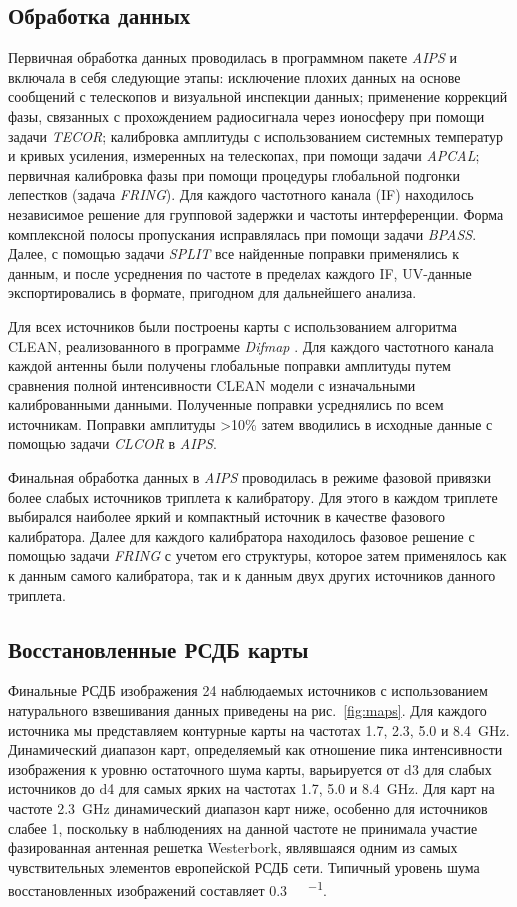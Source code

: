 \subsection{Обработка данных}
Первичная обработка данных проводилась в программном пакете \emph{AIPS} \cite{Greisen_2003} и
включала в себя следующие этапы: исключение плохих данных на основе сообщений с телескопов и
визуальной инспекции данных; применение коррекций фазы, связанных с прохождением радиосигнала через
ионосферу при помощи задачи \emph{TECOR}; калибровка амплитуды с использованием системных
температур и кривых усиления, измеренных на телескопах, при помощи задачи \emph{APCAL}; первичная
калибровка фазы при помощи процедуры глобальной подгонки лепестков (задача \emph{FRING}). Для
каждого частотного канала (IF) находилось независимое решение для групповой задержки и частоты
интерференции. Форма комплексной полосы пропускания исправлялась при помощи задачи
\emph{BPASS}. Далее, с помощью задачи \emph{SPLIT} все найденные поправки применялись к данным, и
после усреднения по частоте в пределах каждого IF, UV-данные экспортировались в формате, пригодном
для дальнейшего анализа.

Для всех источников были построены карты с использованием алгоритма CLEAN, реализованного в
программе {\em Difmap} \cite{Shepherd_1997}. Для каждого частотного канала каждой антенны
были получены глобальные поправки амплитуды путем сравнения полной интенсивности CLEAN модели с
изначальными калиброванными данными. Полученные поправки усреднялись по всем источникам.
Поправки амплитуды >10\% затем вводились в исходные данные с помощью задачи \emph{CLCOR} в
\emph{AIPS}.

Финальная обработка данных в \emph{AIPS} проводилась в режиме фазовой привязки более слабых
источников триплета к калибратору. Для этого в каждом триплете выбирался наиболее яркий и
компактный источник в качестве фазового калибратора. Далее для каждого калибратора находилось
фазовое решение с помощью задачи \emph{FRING} с учетом его структуры, которое затем применялось как
к данным самого калибратора, так и к данным двух других источников данного триплета.

\subsection{Восстановленные РСДБ карты}

Финальные РСДБ изображения 24 наблюдаемых источников с использованием натурального взвешивания
данных приведены на рис.~\ref{fig:maps}. Для каждого источника мы представляем контурные карты на
частотах 1.7, 2.3, 5.0 и \SI{8.4}{\GHz}. Динамический диапазон карт, определяемый как отношение пика
интенсивности изображения к уровню остаточного шума карты, варьируется от \num{d3} для слабых
источников до \num{d4} для самых ярких на частотах 1.7, 5.0 и \SI{8.4}{\GHz}. Для карт на частоте
\SI{2.3}{\GHz} динамический диапазон карт ниже, особенно для источников слабее \SI{1}{\jansky},
поскольку в наблюдениях на данной частоте не принимала участие фазированная антенная решетка
Westerbork, являвшаяся одним из самых чувствительных элементов европейской РСДБ сети. Типичный
уровень шума восстановленных изображений составляет \SI{0.3}{\milli\jansky\per\beam}.

